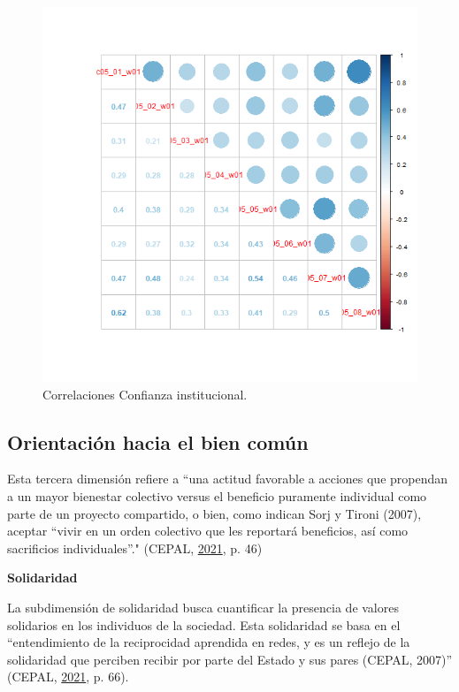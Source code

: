 \documentclass[
  12pt,
]{book}
\begin{document}
\begin{figure}[H]

{\centering \includegraphics[width=1\linewidth,height=1\textheight]{output/graphs/confianza-institucional_cor} 

}

\caption{Correlaciones Confianza institucional.}\label{fig:confianza-institucional-cor}
\end{figure}

\hypertarget{orientaciuxf3n-hacia-el-bien-comuxfan}{%
\subsection{Orientación hacia el bien común}\label{orientaciuxf3n-hacia-el-bien-comuxfan}}

Esta tercera dimensión refiere a ``una actitud favorable a acciones que propendan a un mayor bienestar colectivo versus el beneficio puramente individual como parte de un proyecto compartido, o bien, como indican Sorj y Tironi (2007), aceptar ``vivir en un orden colectivo que les reportará beneficios, así como sacrificios individuales''." (CEPAL, \protect\hyperlink{ref-cepal_Cohesion_2021}{2021}, p. 46)

\textbf{Solidaridad}

La subdimensión de solidaridad busca cuantificar la presencia de valores solidarios en los individuos de la sociedad. Esta solidaridad se basa en el ``entendimiento de la reciprocidad aprendida en redes, y es un reflejo de la solidaridad que perciben recibir por parte del Estado y sus pares (CEPAL, 2007)'' (CEPAL, \protect\hyperlink{ref-cepal_Cohesion_2021}{2021}, p. 66).
\end{document}
